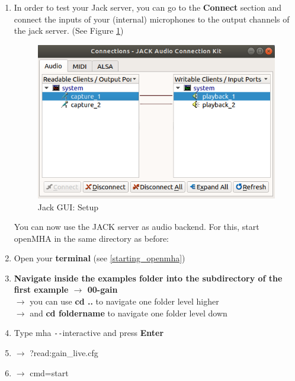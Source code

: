 \documentclass[11pt,a4paper,twoside]{article}
\newcommand{\+}{\discretionary{\mbox{\scriptsize$\hookleftarrow$}}{}{}}
\begin{document}
{{{\begin{enumerate}
    


\item In order to test your Jack server, you can go to the \textbf{Connect} section and connect the inputs of your (internal) microphones to the output channels of the jack server. (See Figure \ref{fig: jack_connection})

\begin{figure}[H]
\centering
\includegraphics[scale=0.4]{jack_connection.png}
\caption{Jack GUI: Setup}
\label{fig: jack_connection}
\end{figure}


You can now use the JACK server as audio backend. For this, start openMHA in the same directory as before:

\item Open your \textbf{terminal} (see \ref{starting_openmha})
    \item \textbf{Navigate inside the examples folder into the subdirectory of the first example $\rightarrow$ \textbf{00-gain}} \\ 
    $\rightarrow$ you can use \textbf{cd ..} to navigate one folder level higher \\
    $\rightarrow$ and \textbf{cd foldername} to navigate one folder level down
    \item Type {{\ttfamily mha \texttt{-{}-}interactive}} and press \textbf{Enter}
 
\item $\rightarrow$ {\ttfamily ?read:gain\_live.cfg}
    \item $\rightarrow$ {\ttfamily cmd=start}


\end{enumerate}}}}
\end{document}
